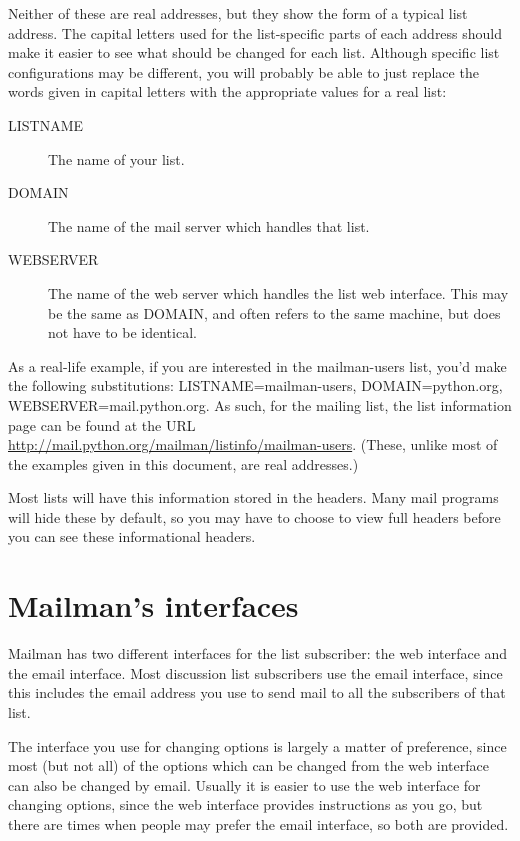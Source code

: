 \documentclass{howto}
\begin{document}
Neither of these are
real addresses, but they show the form of a typical list address.
The capital letters used for the list-specific parts of each address should 
make it easier to see what should be changed for each
list. Although specific list configurations may be different, you will
probably be able to just replace the words given in capital letters with the
appropriate values for a real list:

\begin{description}
	\item [LISTNAME] The name of your list.
	\item [DOMAIN] The name of the mail server which handles that list. 
	\item [WEBSERVER] The name of the web server which handles the list web interface.  This may be the same as DOMAIN, and often refers to the same machine, but does not have to be identical. 
\end{description}

As a real-life example, if you are interested in the mailman-users list, you'd 
make the following substitutions: LISTNAME=mailman-users, DOMAIN=python.org, WEBSERVER=mail.python.org.  As such, for the 
mailing list, the list information page can be found at the URL
\url{http://mail.python.org/mailman/listinfo/mailman-users}.  (These, unlike 
most of the examples given in this document, are real addresses.)

Most lists will have this information stored in the  
headers.  Many
mail programs will hide these by default, so you may have to choose to view
full headers before you can see these informational headers.  

\section{Mailman's interfaces}
Mailman has two different interfaces for the list subscriber: the web 
interface and the email interface.  Most discussion list subscribers use 
the email interface, since this includes the email address you use to send 
mail to all the subscribers of that list.

The interface you use for changing options is largely
a matter of preference, since most (but not all) of the options which can 
be changed from the web interface can also be changed by email.
 Usually it is easier to use the web interface for 
changing options, since the web interface provides instructions as you go, but
there are times when people may prefer the email interface, so both are 
provided.
\end{document}
